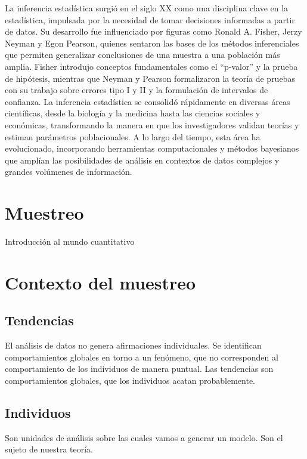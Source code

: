 \documentclass[
  letterpaper,
  DIV=11,
  numbers=noendperiod]{scrreprt}
\begin{document}
La inferencia estadística surgió en el siglo XX como una disciplina
clave en la estadística, impulsada por la necesidad de tomar decisiones
informadas a partir de datos. Su desarrollo fue influenciado por figuras
como Ronald A. Fisher, Jerzy Neyman y Egon Pearson, quienes sentaron las
bases de los métodos inferenciales que permiten generalizar conclusiones
de una muestra a una población más amplia. Fisher introdujo conceptos
fundamentales como el ``p-valor'' y la prueba de hipótesis, mientras que
Neyman y Pearson formalizaron la teoría de pruebas con su trabajo sobre
errores tipo I y II y la formulación de intervalos de confianza. La
inferencia estadística se consolidó rápidamente en diversas áreas
científicas, desde la biología y la medicina hasta las ciencias sociales
y económicas, transformando la manera en que los investigadores validan
teorías y estiman parámetros poblacionales. A lo largo del tiempo, esta
área ha evolucionado, incorporando herramientas computacionales y
métodos bayesianos que amplían las posibilidades de análisis en
contextos de datos complejos y grandes volúmenes de información.

\chapter{Muestreo}\label{muestreo-1}

Introducción al mundo cuantitativo

\hfill\break

\chapter{Contexto del muestreo}\label{contexto-del-muestreo}

\section{Tendencias}\label{tendencias}

El análisis de datos no genera afirmaciones individuales. Se identifican
comportamientos globales en torno a un fenómeno, que no corresponden al
comportamiento de los individuos de manera puntual. Las tendencias son
comportamientos globales, que los individuos acatan probablemente.

\section{Individuos}\label{individuos}

Son unidades de análisis sobre las cuales vamos a generar un modelo. Son
el sujeto de nuestra teoría.
\end{document}
